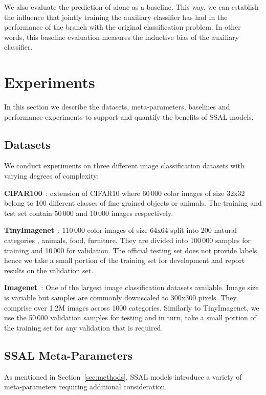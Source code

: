 \documentclass[10pt,twocolumn,letterpaper]{article}
\begin{document}
We also evaluate the prediction of  alone as a baseline.
This way, we can establish the influence that jointly training the auxiliary classifier has had in the performance of the branch with the original classification problem.
In other words, this baseline evaluation measures the inductive bias of the auxiliary classifier.




\section{Experiments}
\label{sec:experiments}

In this section we describe the datasets, meta-parameters, baselines and performance experiments to support and quantify the benefits of SSAL models.

\subsection{Datasets}
We conduct experiments on three different image classification datasets with varying degrees of complexity:

\textbf{CIFAR100}~\cite{krizhevsky2009learning}: extension of CIFAR10 where 60\,000 color images of size 32x32 belong to 100 different classes of fine-grained objects or animals.
The training and test set contain 50\,000 and 10\,000 images respectively.

\textbf{TinyImagenet}~\cite{tinyimagenet}: 110\,000 color images of size 64x64 split into 200 natural categories \eg, animals, food, furniture.
They are divided into 100\,000 samples for training and 10\,000 for validation.
The official testing set does not provide labels, hence we take a small portion of the training set for development and report results on the validation set.

\textbf{Imagenet}~\cite{russakovsky2015imagenet}: One of the largest image classification datasets available.
Image size is variable but samples are commonly downscaled to 300x300 pixels.
They comprise over 1.2M images across 1000 categories.
Similarly to TinyImagenet, we use the 50\,000 validation samples for testing and in turn, take a small portion of the training set for any validation that is required.

\subsection{SSAL Meta-Parameters}
As mentioned in Section~\ref{sec:methods}, SSAL models introduce a variety of meta-parameters requiring additional consideration.
\end{document}
